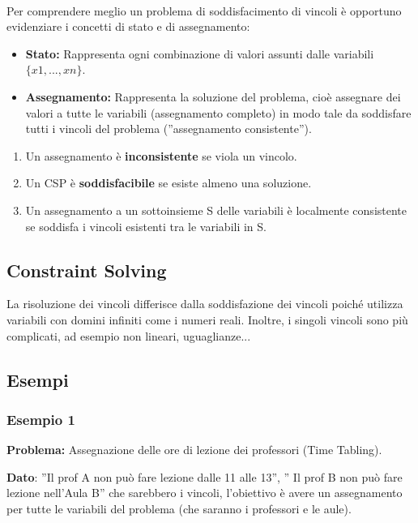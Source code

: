 \vspace{0.5cm}
\\Per comprendere meglio un problema di soddisfacimento di vincoli è opportuno evidenziare i concetti di stato e di assegnamento:
\begin{itemize}
    \item \textbf{Stato:} Rappresenta ogni combinazione di valori assunti dalle variabili $\{x1,..., xn\}$.
    \item \textbf{Assegnamento:} Rappresenta la soluzione del problema, cioè assegnare dei valori a tutte le variabili (assegnamento completo) in modo tale da soddisfare tutti i vincoli del problema (”assegnamento consistente”).
\end{itemize}
\begin{enumerate}
    \item Un assegnamento è \textbf{inconsistente} se viola un vincolo.
    \item Un CSP è \textbf{soddisfacibile} se esiste almeno una soluzione.
    \item Un assegnamento a un sottoinsieme S delle variabili è localmente consistente se soddisfa i vincoli esistenti tra le variabili in S.
\end{enumerate}
\subsection{Constraint Solving}
La risoluzione dei vincoli differisce dalla soddisfazione dei vincoli poiché utilizza variabili con domini infiniti come i numeri reali. Inoltre, i singoli vincoli sono più complicati, ad esempio non lineari, uguaglianze...
\newpage
\subsection{Esempi}
\subsubsection{Esempio 1}
\textbf{Problema:} Assegnazione delle ore di lezione dei professori (Time Tabling).

\vspace{0.2cm}

\textbf{Dato}: ”Il prof A non può fare lezione dalle 11 alle 13”, ” Il prof B non può fare lezione nell’Aula B” che sarebbero i vincoli, l’obiettivo è avere un assegnamento per tutte le variabili del problema (che saranno i professori e le aule).

\vspace{0.2cm}

